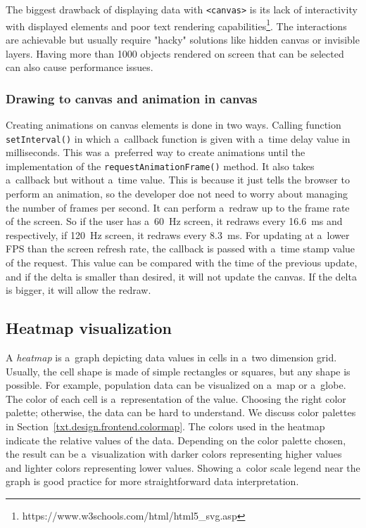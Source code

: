 The biggest drawback of displaying data with \verb|<canvas>| is its lack of interactivity with displayed elements and poor text rendering capabilities\footnote{https://www.w3schools.com/html/html5\_svg.asp}. The interactions are achievable but usually require "hacky" solutions like hidden canvas or invisible layers. Having more than 1000 objects rendered on screen that can be selected can also cause performance issues. 


\subsubsection{Drawing to canvas and animation in canvas}\label{txt.design.animation}

Creating animations on canvas elements is done in two ways. Calling function \verb|setInterval()| in which a~callback function is given with a~time delay value in milliseconds. This was a~preferred way to create animations until the implementation of the \verb|requestAnimationFrame()| method. It also takes a~callback but without a~time value. This is because it just tells the browser to perform an animation, so the developer doe not need to worry about managing the number of frames per second. It can perform a~redraw up to the frame rate of the screen. So if the user has a~\qty{60}{Hz} screen, it redraws every \qty{16.6}{ms} and respectively, if \qty{120}{Hz} screen, it redraws every \qty{8.3}{ms}. For updating at a~lower FPS than the screen refresh rate, the callback is passed with a~time stamp value of the request. This value can be compared with the time of the previous update, and if the delta is smaller than desired, it will not update the canvas. If the delta is bigger, it will allow the redraw.

\subsection{Heatmap visualization}\label{txt.design.frontend.heatmap}

A \textit{heatmap} is a~graph depicting data values in cells in a~two dimension grid. Usually, the cell shape is made of simple rectangles or squares, but any shape is possible. For example, population data can be visualized on a~map or a~globe. The color of each cell is a~representation of the value. Choosing the right color palette; otherwise, the data can be hard to understand. We discuss color palettes in Section~\ref{txt.design.frontend.colormap}. The colors used in the heatmap indicate the relative values of the data. Depending on the color palette chosen, the result can be a~visualization with darker colors representing higher values and lighter colors representing lower values. Showing a~color scale legend near the graph is good practice for more straightforward data interpretation.

